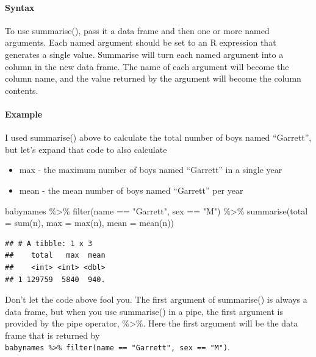 \documentclass[
]{article}
\newenvironment{Shaded}{\begin{snugshade}}{\end{snugshade}}
\newcommand{\AttributeTok}[1]{\textcolor[rgb]{0.77,0.63,0.00}{#1}}
\newcommand{\FunctionTok}[1]{\textcolor[rgb]{0.00,0.00,0.00}{#1}}
\newcommand{\NormalTok}[1]{#1}
\newcommand{\SpecialCharTok}[1]{\textcolor[rgb]{0.00,0.00,0.00}{#1}}
\newcommand{\StringTok}[1]{\textcolor[rgb]{0.31,0.60,0.02}{#1}}
\providecommand{\tightlist}{%
  \setlength{\itemsep}{0pt}\setlength{\parskip}{0pt}}
\begin{document}
\hypertarget{syntax}{%
\paragraph{Syntax}\label{syntax}}

To use summarise(), pass it a data frame and then one or more named
arguments. Each named argument should be set to an R expression that
generates a single value. Summarise will turn each named argument into a
column in the new data frame. The name of each argument will become the
column name, and the value returned by the argument will become the
column contents.

\hypertarget{example}{%
\paragraph{Example}\label{example}}

I used summarise() above to calculate the total number of boys named
``Garrett'', but let's expand that code to also calculate

\begin{itemize}
\tightlist
\item
  max - the maximum number of boys named ``Garrett'' in a single year
\item
  mean - the mean number of boys named ``Garrett'' per year
\end{itemize}

\begin{Shaded}
\begin{Highlighting}[]
\NormalTok{babynames }\SpecialCharTok{\%\textgreater{}\%} 
  \FunctionTok{filter}\NormalTok{(name }\SpecialCharTok{==} \StringTok{"Garrett"}\NormalTok{, sex }\SpecialCharTok{==} \StringTok{"M"}\NormalTok{) }\SpecialCharTok{\%\textgreater{}\%} 
  \FunctionTok{summarise}\NormalTok{(}\AttributeTok{total =} \FunctionTok{sum}\NormalTok{(n), }\AttributeTok{max =} \FunctionTok{max}\NormalTok{(n), }\AttributeTok{mean =} \FunctionTok{mean}\NormalTok{(n))}
\end{Highlighting}
\end{Shaded}

\begin{verbatim}
## # A tibble: 1 x 3
##    total   max  mean
##    <int> <int> <dbl>
## 1 129759  5840  940.
\end{verbatim}

Don't let the code above fool you. The first argument of summarise() is
always a data frame, but when you use summarise() in a pipe, the first
argument is provided by the pipe operator, \%\textgreater\%. Here the
first argument will be the data frame that is returned by
\texttt{babynames\ \%\textgreater{}\%\ filter(name\ ==\ "Garrett",\ sex\ ==\ "M")}.
\end{document}

